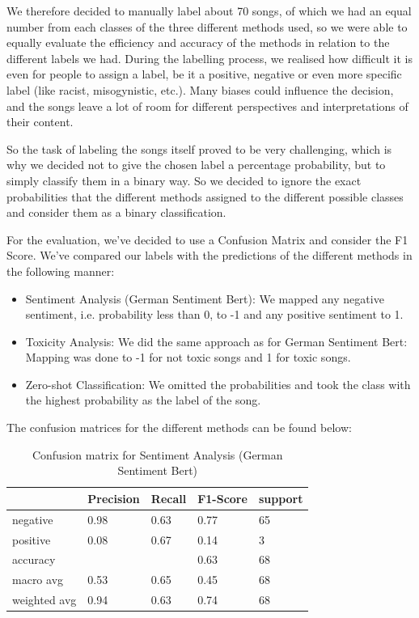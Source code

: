 We therefore decided to manually label about 70 songs, of which we had an equal number from each classes of the three different methods used, so we were able to equally evaluate the efficiency and accuracy of the methods in relation to the different labels we had. During the labelling process, we realised how difficult it is even for people to assign a label, be it a positive, negative or even more specific label (like racist, misogynistic, etc.). Many biases could influence the decision, and the songs leave a lot of room for different perspectives and interpretations of their content. 

So the task of labeling the songs itself proved to be very challenging, which is why we decided not to give the chosen label a percentage probability, but to simply classify them in a binary way. So we decided to ignore the exact probabilities that the different methods assigned to the different possible classes and consider them as a binary classification.


For the evaluation, we've decided to use a Confusion Matrix and consider the F1 Score.
We've compared our labels with the predictions of the different methods in the following manner:
\begin{itemize}
    \item Sentiment Analysis (German Sentiment Bert): We mapped any negative sentiment, i.e. probability less than 0, to -1 and any positive sentiment to 1.
    \item Toxicity Analysis: We did the same approach as for German Sentiment Bert: Mapping was done to -1 for not toxic songs and 1 for toxic songs.
    \item Zero-shot Classification: We omitted the probabilities and took the class with the highest probability as the label of the song.
\end{itemize}

The confusion matrices for the different methods can be found below:

\begin{table}[!htb]
    \centering
    \begin{tabular}{l|llll}
     & Precision & Recall & F1-Score & support \\ \hline \hline
    negative & 0.98 & 0.63 & 0.77 & 65\\
    positive & 0.08 & 0.67 & 0.14 & 3 \\ \hline
    accuracy & & & 0.63 & 68\\
    macro avg & 0.53 & 0.65 & 0.45 & 68 \\
    weighted avg & 0.94 & 0.63 & 0.74 & 68\\
    \end{tabular}
    \caption{Confusion matrix for Sentiment Analysis (German Sentiment Bert)}
    \label{tab:confusion_matrix_sentiment}
\end{table}

